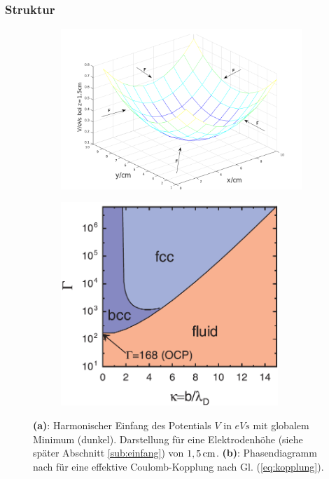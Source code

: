 \documentclass[numbers=noenddot,a4paper]{scrartcl}
\newcommand{\fett}[1]{\textbf{#1}}
\begin{document}
				 \subsubsection{Struktur}

						 \begin{figure}
						 	\centering
						 	\begin{subfigure}[t]{0.48\textwidth}
						 		\centering
						 		\includegraphics[width=1.1\textwidth,height=0.3\textheight]{figs/einfangpotnu.png}
						 		\caption{}
						 		\label{img:potential}
						 	\end{subfigure}
						 	\begin{subfigure}[t]{0.48\textwidth}
						 		\centering
						 		\includegraphics[width=0.9\textwidth,height=0.3\textheight]{figs/gammaphasetransmelzer.png}
						 		\caption{}
						 		\label{img:gamma}
						 	\end{subfigure}
						 	\caption{\fett{(a)}: Harmonischer Einfang des Potentials $V$ in $\unit{eVs}$ mit globalem Minimum (dunkel). Darstellung für eine Elektrodenhöhe (siehe später Abschnitt \ref{sub:einfang}) von $\unit[1,5]{cm}$. \fett{(b)}: Phasendiagramm nach \cite{Melzer12} für eine effektive Coulomb-Kopplung nach Gl. (\ref{eq:kopplung}).}
						 \end{figure}
\end{document}
